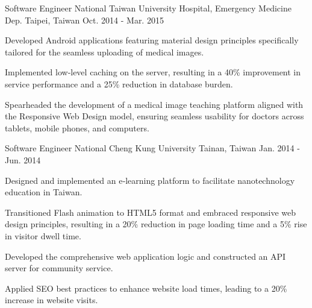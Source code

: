 \begin{cventries}
  \cventry
    {Software Engineer} %
    {National Taiwan University Hospital, Emergency Medicine Dep.} %
    {Taipei, Taiwan} %
    {Oct. 2014 - Mar. 2015} %
    {
      \begin{cvitems} %
        \item {Developed Android applications featuring material design principles specifically tailored for the seamless uploading of medical images.}
        \item {Implemented low‑level caching on the server, resulting in a 40\% improvement in service performance and a 25\% reduction in database burden.}
        \item {Spearheaded the development of a medical image teaching platform aligned with the Responsive Web Design model, ensuring seamless usability for doctors across tablets, mobile phones, and computers.}
      \end{cvitems}
    }

  \cventry
    {Software Engineer} %
    {National Cheng Kung University} %
    {Tainan, Taiwan} %
    {Jan. 2014 - Jun. 2014} %
    {
      \begin{cvitems} %
        \item {Designed and implemented an e‑learning platform to facilitate nanotechnology education in Taiwan.}
        \item {Transitioned Flash animation to HTML5 format and embraced responsive web design principles, resulting in a 20\% reduction in page loading time and a 5\% rise in visitor dwell time.}
        \item {Developed the comprehensive web application logic and constructed an API server for community service.}
        \item {Applied SEO best practices to enhance website load times, leading to a 20\% increase in website visits.}
      \end{cvitems}
    }

\end{cventries}
